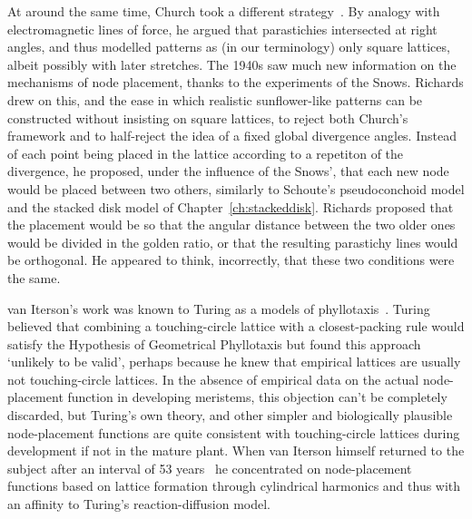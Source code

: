 At around the same time, Church took a different strategy~\cite{churchRelationPhyllotaxisMechanical1904}. By analogy with electromagnetic lines of force, he argued that parastichies intersected at right angles,  and thus modelled patterns as (in our terminology) only square lattices, albeit possibly with later stretches. 
The 1940s saw much new information on the mechanisms of node placement, thanks to the experiments of the Snows. Richards drew on this, and the ease in which realistic sunflower-like patterns can be constructed without insisting on square lattices, to reject both Church's framework and to half-reject the idea of  a fixed global divergence angles. Instead of each point being placed in the lattice according to a repetiton of the divergence, he proposed, under the influence of the Snows', that each new node would be placed between two others, similarly to Schoute's pseudoconchoid model and the stacked disk model of Chapter~\ref{ch:stackeddisk}. Richards proposed that the placement would be so that the angular distance between the two older ones would be divided in the golden ratio, or that the resulting parastichy lines would be orthogonal. He appeared to think, incorrectly, that these two conditions were the same. 

van Iterson's work was known to Turing as a models of phyllotaxis~\cite[Section 14]{turingMorphogenTheoryPhyllotaxis2013}. Turing believed that combining a touching-circle lattice with a closest-packing rule would satisfy the Hypothesis of Geometrical Phyllotaxis but found this approach `unlikely to be valid', perhaps because he knew that empirical lattices are usually not  touching-circle lattices.  In the absence of empirical data on the actual node-placement function in developing meristems, this objection can't be completely discarded, but Turing's own theory, and other simpler and biologically plausible node-placement functions are quite consistent with touching-circle lattices during development if not in the mature plant. When van Iterson himself returned to the subject after an interval of 53 years~\autocite{vanitersonjrNewStudiesPhyllotaxis1960} he concentrated on node-placement functions based on lattice formation through cylindrical harmonics and thus with an affinity to Turing's reaction-diffusion model. 

